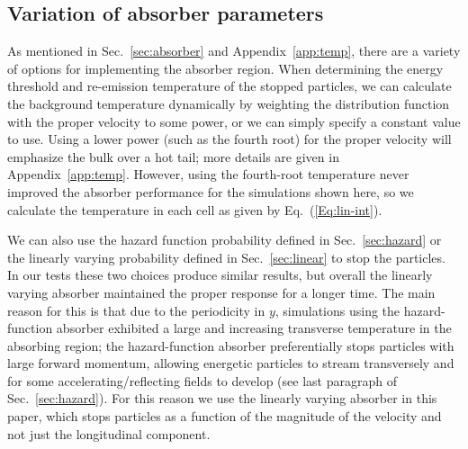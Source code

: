 \documentclass[../absorber.tex]{subfiles}
\begin{document}
\subsection{Variation of absorber parameters}

As mentioned in Sec.~\ref{sec:absorber} and Appendix~\ref{app:temp}, there are a variety of options for implementing the absorber region. 
When determining the energy threshold and re-emission temperature of the stopped particles, we can calculate the background temperature dynamically by weighting the distribution function with the proper velocity to some power,
or we can simply specify a constant value to use. Using a lower power (such as the fourth root) for the proper velocity will emphasize the bulk over a hot tail; more details are given in Appendix~\ref{app:temp}.  However, using the fourth-root temperature never improved the absorber performance for the simulations shown here, so we calculate the temperature in each cell as given by Eq.~(\ref{Eq:lin-int}).

We can also use the hazard function probability defined in Sec.~\ref{sec:hazard} or the linearly varying probability defined in Sec.~\ref{sec:linear} to stop the particles.  In our tests these two choices produce similar results, but overall the linearly varying absorber maintained the proper response for a longer time.  The main reason for this is that due to the periodicity in $y$, simulations using the hazard-function absorber exhibited a large and increasing transverse temperature in the absorbing region; the hazard-function absorber preferentially stops particles with large forward momentum, allowing energetic particles to stream transversely and for some accelerating/reflecting fields to develop (see last paragraph of Sec.~\ref{sec:hazard}).  For this reason we use the linearly varying absorber in this paper, which stops particles as a function of the magnitude of the velocity and not just the longitudinal component.

\end{document}
